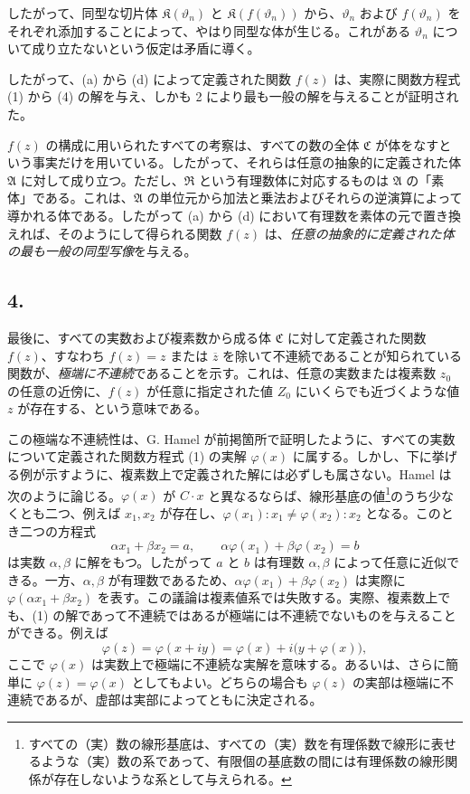 \documentclass[11pt]{article}
\begin{document}
したがって、同型な切片体 $\mathfrak K(\vartheta_n)$ と $\mathfrak K(f(\vartheta_n))$ から、$\vartheta_n$ および $f(\vartheta_n)$ をそれぞれ添加することによって、やはり同型な体が生じる。これがある $\vartheta_n$ について成り立たないという仮定は矛盾に導く。

したがって、(a) から (d) によって定義された関数 $f(z)$ は、実際に関数方程式 (1) から (4) の解を与え、しかも 2 により最も一般の解を与えることが証明された。

$f(z)$ の構成に用いられたすべての考察は、すべての数の全体 $\mathfrak C$ が体をなすという事実だけを用いている。したがって、それらは任意の抽象的に定義された体 $\mathfrak A$ に対して成り立つ。ただし、$\mathfrak R$ という有理数体に対応するものは $\mathfrak A$ の「素体」である。これは、$\mathfrak A$ の単位元から加法と乗法およびそれらの逆演算によって導かれる体である。したがって (a) から (d) において有理数を素体の元で置き換えれば、そのようにして得られる関数 $f(z)$ は、\emph{任意の抽象的に定義された体の最も一般の同型写像}を与える。

\subsection*{4.}

最後に、すべての実数および複素数から成る体 $\mathfrak C$ に対して定義された関数 $f(z)$、すなわち $f(z)=z$ または $\overline z$ を除いて不連続であることが知られている関数が、\emph{極端に不連続}であることを示す。これは、任意の実数または複素数 $z_0$ の任意の近傍に、$f(z)$ が任意に指定された値 $Z_0$ にいくらでも近づくような値 $z$ が存在する、という意味である。

この極端な不連続性は、G. Hamel が前掲箇所で証明したように、すべての実数について定義された関数方程式 (1) の実解 $\varphi(x)$ に属する。しかし、下に挙げる例が示すように、複素数上で定義された解には必ずしも属さない。Hamel は次のように論じる。$\varphi(x)$ が $C\cdot x$ と異なるならば、線形基底の値\footnote{すべての（実）数の線形基底は、すべての（実）数を有理係数で線形に表せるような（実）数の系であって、有限個の基底数の間には有理係数の線形関係が存在しないような系として与えられる。}のうち少なくとも二つ、例えば $x_1,x_2$ が存在し、$\varphi(x_1):x_1\ne\varphi(x_2):x_2$ となる。このとき二つの方程式
\[
\alpha x_1+\beta x_2=a,
\qquad
\alpha\varphi(x_1)+\beta\varphi(x_2)=b
\]
は実数 $\alpha,\beta$ に解をもつ。したがって $a$ と $b$ は有理数 $\alpha,\beta$ によって任意に近似できる。一方、$\alpha,\beta$ が有理数であるため、$\alpha\varphi(x_1)+\beta\varphi(x_2)$ は実際に $\varphi(\alpha x_1+\beta x_2)$ を表す。この議論は複素値系では失敗する。実際、複素数上でも、(1) の解であって不連続ではあるが極端には不連続でないものを与えることができる。例えば
\[
\varphi(z)=\varphi(x+iy)=\varphi(x)+i\bigl(y+\varphi(x)\bigr),
\]
ここで $\varphi(x)$ は実数上で極端に不連続な実解を意味する。あるいは、さらに簡単に $\varphi(z)=\varphi(x)$ としてもよい。どちらの場合も $\varphi(z)$ の実部は極端に不連続であるが、虚部は実部によってともに決定される。
\end{document}
